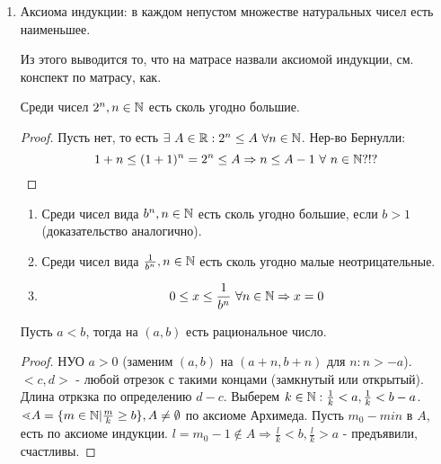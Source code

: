 \documentclass[12pt]{report}
\begin{document}
\begin{defn}[ = Аксиоматический подход к построению $\R$]
\begin{enumerate}
\begin{st}
$$\forall ~x, y \in \R ~||x| - |y|| \le |x - y|$$
\end{st}
\begin{proof}
$$x = y + (x - y) \Rightarrow |x| \le |y| + |x - y| \Rightarrow |x| - |y| \le |x - y|$$
А если поменять $x, y$ местами, получим
$$|y| - |x| \le |x - y| \Rightarrow \mbox{что нужно}$$
\end{proof}

\item Аксиома индукции: в каждом непустом множестве натуральных чисел есть наименьшее. 

Из этого выводится то, что на матрасе назвали аксиомой индукции, см. конспект по матрасу, как.

\begin{st}
Среди чисел $2^n, n \in \mathbb{N}$ есть сколь угодно большие. 
\end{st}
\begin{proof}
Пусть нет, то есть $\exists ~A \in \mathbb{R}: 2^n \le A ~\forall n \in \mathbb{N}$. Нер-во Бернулли: $$1 + n \le (1 + 1)^n = 2^n \le A \Rightarrow n \le A - 1 ~\forall ~n \in \mathbb{N} ?!?$$
\end{proof}

\begin{cor}
\begin{enumerate}
\item Среди чисел вида $b^n, n \in \mathbb{N}$ есть сколь угодно большие, если $b > 1$ (доказательство аналогично).

\item Среди чисел вида $\frac{1}{b^n}, n \in \mathbb{N}$ есть сколь угодно малые неотрицательные.

\item $$0 \le x \le \frac{1}{b^n} ~\forall n \in \mathbb{N} \Rightarrow x = 0$$
\end{enumerate}
\end{cor}

\begin{thm}{\label{thm1}}
Пусть $a < b$, тогда на $(a, b)$ есть рациональное число.
\end{thm}
\begin{proof}
НУО $a > 0$ (заменим $(a, b)$ на $(a + n, b + n)$ для $n: n > -a$). $<c, d>$ - любой отрезок с такими концами (замкнутый или открытый). Длина отркзка по определению $d - c$. Выберем $k \in \mathbb{N}: \frac{1}{k} < a, \frac{1}{k} < b - a$. $\lessdot A = \{m \in \mathbb{N} | \frac{m}{k} \ge b\}, A \neq \emptyset$ по аксиоме Архимеда. Пусть $m_0 - min$ в $A$, есть по аксиоме индукции. $l = m_0 - 1 \notin A \Rightarrow \frac{l}{k} < b, \frac{l}{k} > a$ - предъявили, счастливы.
\end{proof}


\end{enumerate}
\end{defn}
\end{document}
